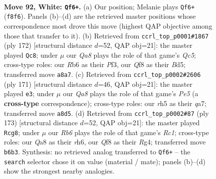 \documentclass[11pt]{article}
\begin{document}
\clearpage

\begin{figure}[p]\centering
\begin{subfigure}{0.46\textwidth}\centering
\resizebox{\linewidth}{!}{%
\newchessgame
\chessboard[
  setfen={Q4Q2/8/1R5n/6kr/8/8/8/K7 w - - 5 92},
  showmover=false,
  pgfstyle=straightmove, color=movearrow, markmove={f8-f6}
]}
\caption{}
\end{subfigure}\hfill
\begin{subfigure}{0.46\textwidth}\centering
\resizebox{\linewidth}{!}{%
\newchessgame
\chessboard[
  setfen={8/5nk1/5r2/2QB4/5b2/5P2/4K3/8 w - - 41 87},
  showmover=false,
  pgfstyle=straightmove, color=movearrow, markmove={c5-c8}
]}
\caption{}
\end{subfigure}
\\[4pt]
\begin{subfigure}{0.46\textwidth}\centering
\resizebox{\linewidth}{!}{%
\newchessgame
\chessboard[
  setfen={8/Q7/4k3/8/4p3/5q2/8/3NK3 b - - 5 86},
  showmover=false,
  pgfstyle=straightmove, color=movearrow, markmove={e4-e3}
]}
\caption{}
\end{subfigure}\hfill
\begin{subfigure}{0.46\textwidth}\centering
\resizebox{\linewidth}{!}{%
\newchessgame
\chessboard[
  setfen={2r5/8/7R/8/4k1r1/8/6N1/5R1K b - - 35 87},
  showmover=false,
  pgfstyle=straightmove, color=movearrow, markmove={c8-g8}
]}
\caption{}
\end{subfigure}
\caption{\textbf{Move 92, White: \texttt{Qf6+}.} (a) Our position; Melanie plays \texttt{Qf6+} (\texttt{f8f6}). Panels (b)--(d) are the retrieved master positions whose correspondence most drove this move (highest QAP objective among those that transfer to it). (b) Retrieved from \texttt{ccrl\_top\_p0001\#1867} (ply 172) [structural distance $d$=52, QAP obj=21]: the master played \texttt{Qc8}; under $\mu$ our \emph{Qa8} plays the role of that game's \emph{Qc5}; cross-type roles: our \emph{R}b6 as their \emph{P}f3, our \emph{Q}f8 as their \emph{B}d5; transferred move \texttt{a8a7}. (c) Retrieved from \texttt{ccrl\_top\_p0002\#2606} (ply 171) [structural distance $d$=46, QAP obj=21]: the master played \texttt{e3}; under $\mu$ our \emph{Qa8} plays the role of that game's \emph{Pe5} (a \textbf{cross-type} correspondence); cross-type roles: our \emph{r}h5 as their \emph{q}a7; transferred move \texttt{a8d5}. (d) Retrieved from \texttt{ccrl\_top\_p0002\#87} (ply 173) [structural distance $d$=52, QAP obj=21]: the master played \texttt{Rcg8}; under $\mu$ our \emph{Rb6} plays the role of that game's \emph{Rc1}; cross-type roles: our \emph{Q}a8 as their \emph{r}h6, our \emph{Q}f8 as their \emph{R}g4; transferred move \texttt{b6b3}. Synthesis: no retrieved analog transferred to \texttt{Qf6+} -- the \texttt{search} selector chose it on value (material / mate); panels (b)--(d) show the strongest nearby analogies.}
\label{fig:thought-m182}
\end{figure}
\end{document}
